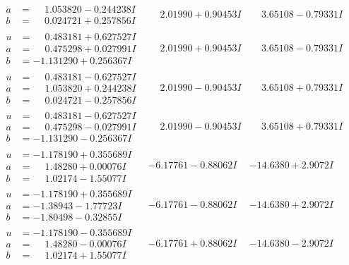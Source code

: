 \documentclass[1p]{elsarticle_modified}
\theoremstyle{definition}
\begin{document}
$$\begin{array}{c|c|c}
\begin{aligned}
a &= \phantom{-}1.053820 - 0.244238 I \\
b &= \phantom{-}0.024721 + 0.257856 I\end{aligned}
 & \phantom{-}2.01990 + 0.90453 I & \phantom{-}3.65108 - 0.79331 I \\ \hline\begin{aligned}
u &= \phantom{-}0.483181 + 0.627527 I \\
a &= \phantom{-}0.475298 + 0.027991 I \\
b &= -1.131290 + 0.256367 I\end{aligned}
 & \phantom{-}2.01990 + 0.90453 I & \phantom{-}3.65108 - 0.79331 I \\ \hline\begin{aligned}
u &= \phantom{-}0.483181 - 0.627527 I \\
a &= \phantom{-}1.053820 + 0.244238 I \\
b &= \phantom{-}0.024721 - 0.257856 I\end{aligned}
 & \phantom{-}2.01990 - 0.90453 I & \phantom{-}3.65108 + 0.79331 I \\ \hline\begin{aligned}
u &= \phantom{-}0.483181 - 0.627527 I \\
a &= \phantom{-}0.475298 - 0.027991 I \\
b &= -1.131290 - 0.256367 I\end{aligned}
 & \phantom{-}2.01990 - 0.90453 I & \phantom{-}3.65108 + 0.79331 I \\ \hline\begin{aligned}
u &= -1.178190 + 0.355689 I \\
a &= \phantom{-}1.48280 + 0.00076 I \\
b &= \phantom{-}1.02174 - 1.55077 I\end{aligned}
 & -6.17761 - 0.88062 I & -14.6380 + 2.9072 I \\ \hline\begin{aligned}
u &= -1.178190 + 0.355689 I \\
a &= -1.38943 - 1.77723 I \\
b &= -1.80498 - 0.32855 I\end{aligned}
 & -6.17761 - 0.88062 I & -14.6380 + 2.9072 I \\ \hline\begin{aligned}
u &= -1.178190 - 0.355689 I \\
a &= \phantom{-}1.48280 - 0.00076 I \\
b &= \phantom{-}1.02174 + 1.55077 I\end{aligned}
 & -6.17761 + 0.88062 I & -14.6380 - 2.9072 I \\ \hline\begin{aligned}

\end{aligned}
\end{array}$$
\end{document}
